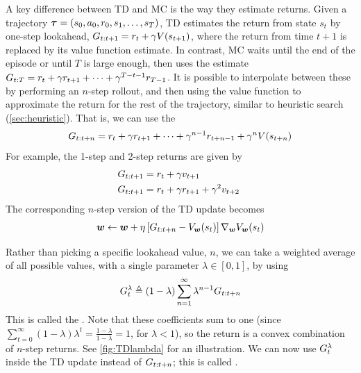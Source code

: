 A key difference between TD and MC is
the way they estimate returns.
Given a trajectory
$\boldsymbol{\tau}=(s_0,a_0,r_0,s_1,\ldots,s_T)$,
TD estimates the return from state $s_t$
by one-step lookahead,
$G_{t:t+1} = r_t + \gamma V(s_{t+1})$,
where the return from time $t+1$ is replaced by
its value function estimate.
In contrast, MC waits until the end of the episode
or until $T$ is large enough,
then uses the estimate
$G_{t:T} = r_t + \gamma r_{t+1} + \cdots + \gamma^{T-t-1} r_{T-1}$.
It is possible to interpolate between these by
performing an $n$-step rollout, and then using
the value function to approximate the return
for the rest of the trajectory,
similar to heuristic search (\cref{sec:heuristic}).
That is, we can use the 
\begin{align}
G_{t:t+n} = r_{t} + \gamma r_{t+1} + \cdots
+ \gamma^{n-1} r_{t+n-1} + \gamma^n V(s_{t+n})
\end{align}
For example, the 1-step and 2-step returns are given by
\begin{align}
  G_{t:t+1} &= r_{t} + \gamma v_{t+1} \\
  G_{t:t+1} &= r_{t} + \gamma r_{t+1} + \gamma^2 v_{t+2} \
  \end{align}
The corresponding $n$-step version of the TD update becomes
\begin{align}
  {\bm{w}} \leftarrow {\bm{w}} + \eta
  \left[G_{t:t+n}  - V_{{\bm{w}}}(s_t) \right]
  \nabla_{{\bm{w}}}V_{{\bm{w}}}(s_t)
\end{align}

Rather than picking a specific lookahead value, $n$,
we can take a weighted average of all possible values,
with a single parameter $\lambda\in[0,1]$,
by using
\begin{align}
\label{eqn:rl-gamma-return}
G_{t}^{\lambda}
\triangleq (1-\lambda) \sum_{n=1}^{\infty} \lambda^{n-1} G_{t:t+n}
\end{align}
This is called the .
Note that these coefficients sum to one
(since $\sum_{t=0}^{\infty} (1-\lambda) \lambda^t = \frac{1-\lambda}{1-\lambda}=1$,
for $\lambda<1$),
so the return is a convex combination of $n$-step returns.
See \cref{fig:TDlambda} for an illustration.
We can now use $G_t^{\lambda}$ inside the TD update
instead of $G_{t:t+n}$;
this is called .

